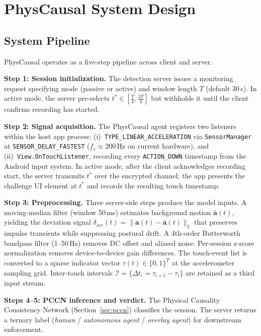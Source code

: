 \section{PhysCausal System Design}
\label{sec:method}

\subsection{System Pipeline}
\label{sec:pipeline}

PhysCausal operates as a five-step pipeline across client and server.%

\noindent\textbf{Step 1: Session initialization.}
The detection server issues a monitoring request specifying mode (passive or active) and
window length $T$ (default 30\,s).%
In active mode, the server pre-selects $t^* \in [\frac{T}{4}, \frac{3T}{4}]$ but
withholds it until the client confirms recording has started.%

\noindent\textbf{Step 2: Signal acquisition.}
The PhysCausal agent registers two listeners within the host app process:
(i)~\texttt{TYPE\_LINEAR\_ACCELERATION} via \texttt{SensorManager} at
\texttt{SENSOR\_DELAY\_FASTEST} ($f_s \approx 200$\,Hz on current hardware), and
(ii)~\texttt{View.OnTouchListener}, recording every \texttt{ACTION\_DOWN} timestamp
from the Android input system.%
In active mode, after the client acknowledges recording start, the server transmits $t^*$
over the encrypted channel; the app presents the challenge UI element at $t^*$ and
records the resulting touch timestamp.%

\noindent\textbf{Step 3: Preprocessing.}
Three server-side steps produce the model inputs.%
A moving-median filter (window 50\,ms) estimates background motion $\bar{\mathbf{a}}(t)$,
yielding the deviation signal
$\delta_{\mathrm{acc}}(t) = \|\mathbf{a}(t) - \bar{\mathbf{a}}(t)\|_2$
that preserves impulse transients while suppressing postural drift.%
A 4th-order Butterworth bandpass filter (1--50\,Hz) removes DC offset and aliased noise.%
Per-session z-score normalization removes device-to-device gain differences.%
The touch-event list is converted to a sparse indicator vector $\tau(t) \in \{0,1\}^T$
at the accelerometer sampling grid.%
Inter-touch intervals $\mathcal{I} = \{\Delta t_i = \tau_{i+1} - \tau_i\}$ are retained
as a third input stream.%

\noindent\textbf{Steps 4--5: PCCN inference and verdict.}
The Physical Causality Consistency Network (Section~\ref{sec:pccn}) classifies the session.%
The server returns a ternary label
(\textit{human} / \textit{autonomous agent} / \textit{overlay agent}) for downstream
enforcement.%

